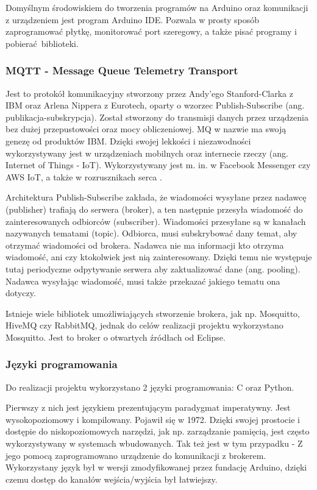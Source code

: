 \documentclass[12pt,twoside,polish]{article}
\begin{document}
Domyślnym środowiskiem do tworzenia programów na Arduino oraz komunikacji z urządzeniem jest program Arduino IDE. Pozwala w prosty sposób zaprogramować płytkę, monitorować port szeregowy, a także pisać programy i pobierać biblioteki.


\subsubsection[MQTT]{MQTT - Message Queue Telemetry Transport}

Jest to protokół komunikacyjny stworzony przez Andy'ego Stanford-Clarka z IBM oraz Arlena Nippera z Eurotech, oparty o wzorzec Publish-Subscribe (ang. publikacja-subskrypcja). Został stworzony do transmisji danych przez urządzenia bez dużej przepustowości oraz mocy obliczeniowej. MQ w nazwie ma swoją genezę od produktów IBM. Dzięki swojej lekkości i niezawodności wykorzystywany jest w urządzeniach mobilnych oraz internecie rzeczy (ang. Internet of Things - IoT). Wykorzystywany jest m. in. w Facebook Messenger czy AWS IoT, a także w rozrusznikach serca \cite{mqtt}.

Architektura Publish-Subscribe zakłada, że wiadomości wysyłane przez nadawcę (publisher) trafiają do serwera (broker), a ten następnie przesyła wiadomość do zainteresowanych odbiorców (subscriber). Wiadomości przesyłane są w kanałach nazywanych tematami (topic). Odbiorca, musi subskrybować dany temat, aby otrzymać wiadomości od brokera. Nadawca nie ma informacji kto otrzyma wiadomość, ani czy ktokolwiek jest nią zainteresowany. Dzięki temu nie występuje tutaj periodyczne odpytywanie serwera aby zaktualizować dane (ang. pooling). Nadawca wysyłając wiadomość, musi także przekazać jakiego tematu ona dotyczy.

Istnieje wiele bibliotek umożliwiających stworzenie brokera, jak np. Mosquitto, HiveMQ czy RabbitMQ, jednak do celów realizacji projektu wykorzystano Mosquitto. Jest to broker o otwartych źródłach od Eclipse.

\subsubsection{Języki programowania}

Do realizacji projektu wykorzystano 2 języki programowania: C oraz Python.

Pierwszy z nich jest językiem prezentującym paradygmat imperatywny. Jest wysokopoziomowy i kompilowany. Pojawił się w 1972. Dzięki swojej prostocie i dostępie do niskopoziomowych narzędzi, jak np. zarządzanie pamięcią, jest często wykorzystywany w systemach wbudowanych. Tak też jest w tym przypadku - Z jego pomocą zaprogramowano urządzenie do komunikacji z brokerem. Wykorzystany język był w wersji zmodyfikowanej przez fundację Arduino, dzięki czemu dostęp do kanałów wejścia/wyjścia był łatwiejszy.
\end{document}
